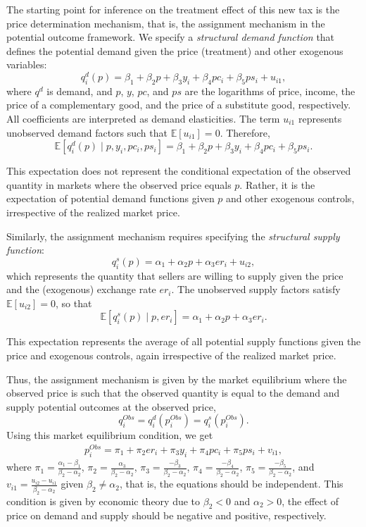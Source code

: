 The starting point for inference on the treatment effect of this new tax is the price determination mechanism, that is, the assignment mechanism in the potential outcome framework. We specify a \textit{structural demand function} that defines the potential demand given the price (treatment) and other exogenous variables:
\[
q_i^d(p) = \beta_1 + \beta_2 p + \beta_3 y_i + \beta_4 pc_i + \beta_5 ps_i + u_{i1},
\]
where $q^d$ is demand, and $p$, $y$, $pc$, and $ps$ are the logarithms of price, income, the price of a complementary good, and the price of a substitute good, respectively. All coefficients are interpreted as demand elasticities. The term $u_{i1}$ represents unobserved demand factors such that $\mathbb{E}[u_{i1}]=0$. Therefore,
\[
\mathbb{E}[q_i^d(p)\mid p, y_i, pc_i, ps_i] = \beta_1 + \beta_2 p + \beta_3 y_i + \beta_4 pc_i + \beta_5 ps_i.
\]

This expectation does not represent the conditional expectation of the observed quantity in markets where the observed price equals $p$. Rather, it is the expectation of potential demand functions given $p$ and other exogenous controls, irrespective of the realized market price.

Similarly, the assignment mechanism requires specifying the \textit{structural supply function}:
\[
q_i^s(p) = \alpha_1 + \alpha_2 p + \alpha_3 er_i + u_{i2},
\]
which represents the quantity that sellers are willing to supply given the price and the (exogenous) exchange rate $er_i$. The unobserved supply factors satisfy $\mathbb{E}[u_{i2}]=0$, so that
\[
\mathbb{E}[q_i^s(p)\mid p, er_i] = \alpha_1 + \alpha_2 p + \alpha_3 er_i.
\]

This expectation represents the average of all potential supply functions given the price and exogenous controls, again irrespective of the realized market price.

Thus, the assignment mechanism is given by the market equilibrium where the observed price is such that the observed quantity is equal to the demand and supply potential outcomes at the observed price,
\[
q_i^{Obs}=q_i^d(p_i^{Obs})=q_i^s(p_i^{Obs}).
\] 
Using this market equilibrium condition, we get
\begin{align*}
	p_i^{Obs}=\pi_1+\pi_2 er_i + \pi_3 y_i + \pi_4 pc_i + \pi_5 ps_i + v_{i1},
\end{align*}
where $\pi_1=\frac{\alpha_1-\beta_1}{\beta_2-\alpha_2}$, $\pi_2=\frac{\alpha_3}{\beta_2-\alpha_2}$, $\pi_3=\frac{-\beta_3}{\beta_2-\alpha_2}$, $\pi_4=\frac{-\beta_4}{\beta_2-\alpha_2}$, $\pi_5=\frac{-\beta_5}{\beta_2-\alpha_2}$, and $v_{i1}=\frac{u_{i2}-u_{i1}}{\beta_2-\alpha_2}$ given $\beta_2\neq\alpha_2$, that is, the equations should be independent. This condition is given by economic theory due to $\beta_2<0$ and $\alpha_2>0$, the effect of price on demand and supply should be negative and positive, respectively.

